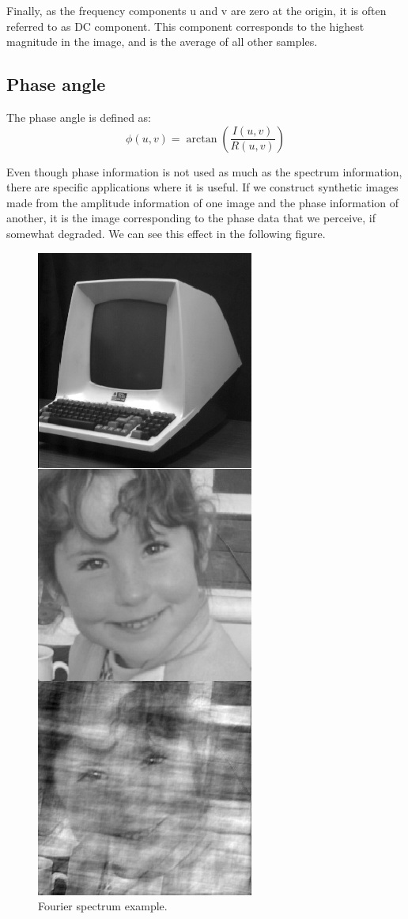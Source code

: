 \documentclass[12pt]{article}
\begin{document}
Finally, as the frequency components u and v are zero at the origin, it is often referred to as DC component. This component corresponds to the highest magnitude in the image, and is the average of all other samples.

\subsection{Phase angle}
The phase angle is defined as:
\begin{equation}
	\phi(u,v) = \arctan(\frac{I(u,v)}{R(u,v)})
\end{equation}

Even though phase information is not used as much as the spectrum information, there are specific applications where it is useful. If we construct synthetic images made from the amplitude information of one image and the phase information of another, it is the image corresponding to the phase data that we perceive, if somewhat degraded. We can see this effect in the following figure.

\begin{figure}[!htbp]
	\begin{center}
		\leavevmode
		\includegraphics[scale=1]{images/phase.png}
		\caption{Fourier spectrum example.}
		\label{fig:rasterData}
	\end{center}
\end{figure}



\end{document}
